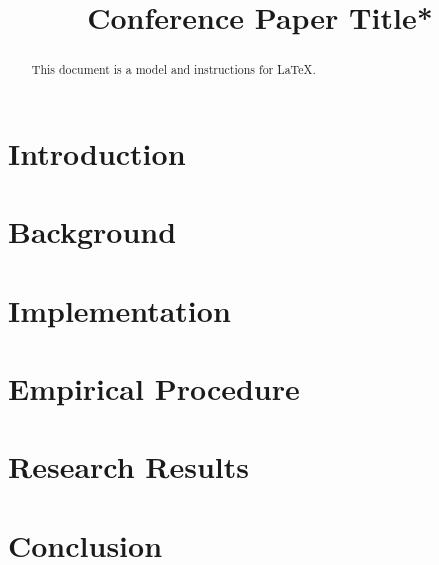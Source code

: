 \documentclass[conference]{IEEEtran}
\begin{document}
\title{Conference Paper Title*\\
}

\author{
}

\maketitle

\begin{abstract}
This document is a model and instructions for \LaTeX.
\end{abstract}


\section{Introduction}
\section{Background}
\section{Implementation}
\section{Empirical Procedure}
\section{Research Results}
\section{Conclusion}

% 
% 
\end{document}
